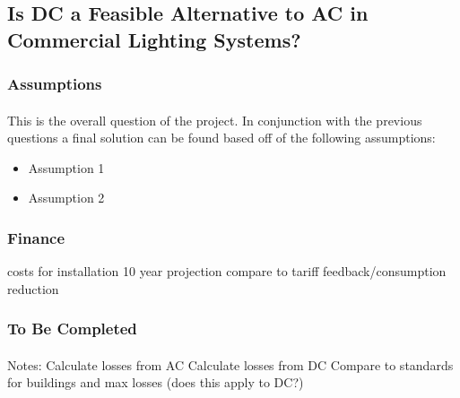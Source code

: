 \subsection{Is DC a Feasible Alternative to AC in Commercial Lighting Systems?}

\subsubsection{Assumptions}
\paragraph{}
This is the overall question of the project. In conjunction with the previous questions a final solution can be found based off of the following assumptions:

\begin{itemize}[noitemsep,nolistsep]
	\item Assumption 1
	\item Assumption 2
\end{itemize}

\subsubsection{Finance}
costs for installation
10 year projection
compare to tariff feedback/consumption reduction

\subsubsection{To Be Completed}
\paragraph{}
Notes:
\newline
Calculate losses from AC
Calculate losses from DC
Compare to standards for buildings and max losses (does this apply to DC?)